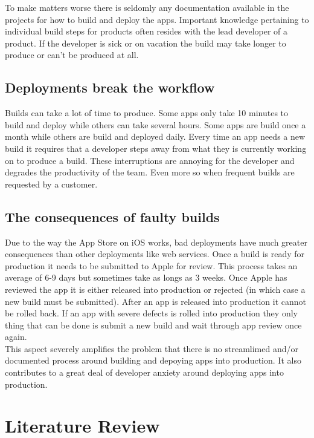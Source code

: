 \documentclass{ituthesis}
\begin{document}
To make matters worse there is seldomly any documentation available in the projects for how to build and deploy the apps. Important knowledge pertaining to individual build steps for products often resides with the lead developer of a product. If the developer is sick or on vacation the build may take longer to produce or can't be produced at all. 

\section{Deployments break the workflow}

Builds can take a lot of time to produce. Some apps only take 10 minutes to build and deploy while others can take several hours. Some apps are build once a month while others are build and deployed daily. Every time an app needs a new build it requires that a developer steps away from what they is currently working on to produce a build. These interruptions are annoying for the developer and degrades the productivity of the team. Even more so when frequent builds are requested by a customer.


\section{The consequences of faulty builds}

Due to the way the App Store on iOS works, bad deployments have much greater consequences than other deployments like web services. Once a build is ready for production it needs to be submitted to Apple for review. This process takes an average of 6-9 days but sometimes take as longs as 3 weeks. Once Apple has reviewed the app it is either released into production or rejected (in which case a new build must be submitted). After an app is released into production it cannot be rolled back. If an app with severe defects is rolled into production they only thing that can be done is submit a new build and wait through app review once again.\\

This aspect severely amplifies the problem that there is no streamlimed and/or documented process around building and depoying apps into production. It also contributes to a great deal of developer anxiety around deploying apps into production.

\chapter{Literature Review}
\end{document}
